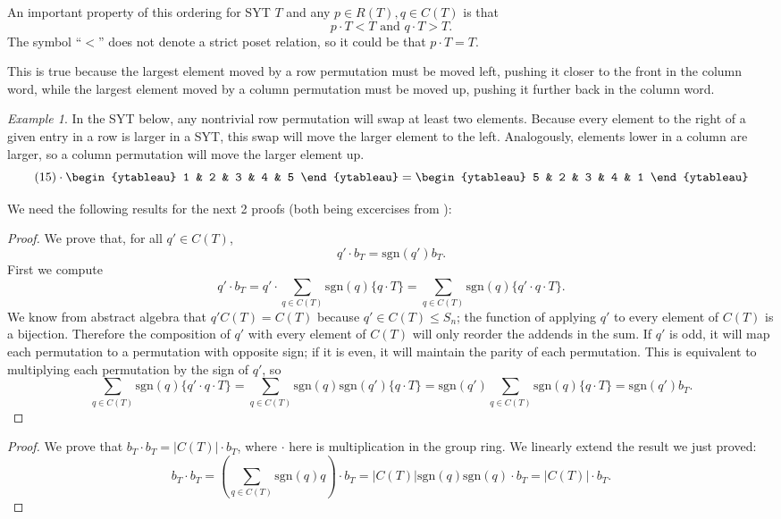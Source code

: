 \documentclass[12pt,twoside]{reedthesis}
\theoremstyle{plain}   %
\theoremstyle{definition}
\theoremstyle{remark}
\newtheorem{ex}{Example}[section]
\numberwithin{equation}{section}
\def\sgn{\mathrm{sgn}}
\begin{document}
  An important property of this ordering for SYT $T$ and any $p \in R(T), q\in C(T)$ is that
  \[ p \cdot T < T \text{ and } q \cdot T > T.\]
  The symbol ``$<$'' does not denote a strict poset relation, so it could be that $p \cdot T = T$. \par
  This is true because the largest element moved by a row permutation must be moved left, pushing it closer to the front in the column word,
  while the largest element moved by a column permutation must be moved up, pushing it further back in the column word.
  \begin{ex}
    In the SYT below, any nontrivial row permutation will swap at least two elements.
    Because every element to the right of a given entry in a row is larger in a SYT, this swap will move the larger element to the left.
    Analogously, elements lower in a column are larger, so a column permutation will move the larger element up.
    \[
      (15) \cdot 
      \begin{ytableau}
        1 & 2 & 3 & 4 & 5 
      \end{ytableau}
      =
      \begin{ytableau}
        5 & 2 & 3 & 4 & 1 
      \end{ytableau}
    \]
  \end{ex}

  We need the following results for the next 2 proofs (both being excercises from \cite{fulton}):
  \begin{proof}
    We prove that, for all $q' \in C(T)$,
    \[q' \cdot b_T = \sgn(q') b_T.\]
    First we compute
    \[q' \cdot b_T = q' \cdot \sum_{q \in C(T)} \sgn(q)\{q \cdot T\} = \sum_{q \in C(T)} \sgn(q)\{q' \cdot q \cdot T\}.\]
    We know from abstract algebra that $q' C(T) = C(T)$ because $q' \in C(T) \leq S_n$; the function of applying $q'$ to every element of $C(T)$ is a
    bijection.
    Therefore the composition of $q'$ with every element of $C(T)$ will only reorder the addends in the sum.
    If $q'$ is odd, it will map each permutation to a permutation with opposite sign; if it is even, it will maintain the parity of each permutation.
    This is equivalent to multiplying  each permutation by the sign of $q'$, so
    \[\sum_{q \in C(T)} \sgn(q)\{q' \cdot q \cdot T\} = \sum_{q \in C(T)} \sgn(q)\sgn(q') \{q \cdot T\}
      = \sgn(q') \sum_{q \in C(T)} \sgn(q) \{q \cdot T\} = \sgn(q') b_T.\]
  \end{proof}
  \begin{proof}
    We prove that $b_T \cdot b_T = |C(T)| \cdot b_T$, where $\cdot$ here is multiplication in the group ring.
    We linearly extend the result we just proved:
    \[ b_T \cdot b_T = (\sum_{q \in C(T)} \sgn(q)q) \cdot b_T = |C(T)|\sgn(q)\sgn(q) \cdot b_T = |C(T)| \cdot b_T.\]  
  \end{proof}
\end{document}
